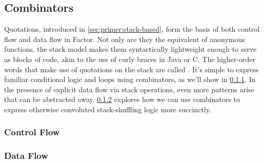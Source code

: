 \subsection{Combinators}\label{sec:primer:combinators}

Quotations, introduced in \cref{sec:primer:stack-based}, form the basis of both
control flow and data flow in Factor.  Not only are they the equivalent of
anonymous functions, the stack model makes them syntactically lightweight
enough to serve as blocks of code, akin to the use of curly braces in Java or
C.  The higher-order words that make use of quotations on the stack are called
.  It's simple to express familiar conditional logic and
loops using combinators, as we'll show in \cref{sec:primer:control-flow}.  In
the presence of explicit data flow via stack operations, even more patterns
arise that can be abstracted away.  \cref{sec:primer:data-flow} explores how we
can use combinators to express otherwise convoluted stack-shuffling logic more
succinctly.

\subsubsection{Control Flow}\label{sec:primer:control-flow}

\subsubsection{Data Flow}\label{sec:primer:data-flow}
